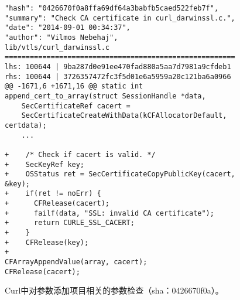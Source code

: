 \begin{figure}[t]
	\centering
\begin{lstlisting}
"hash": "0426670f0a8ffa69df64a3babfb5caed522feb7f",
"summary": "Check CA certificate in curl_darwinssl.c.",
"date": "2014-09-01 00:34:37",
"author": "Vilmos Nebehaj",
lib/vtls/curl_darwinssl.c
=======================================================
lhs: 100644 | 9ba287d0e91ee470fad880a5aa7d7981a9cfdeb1
rhs: 100644 | 3726357472fc3f5d01e6a5959a20c121ba6a0966
@@ -1671,6 +1671,16 @@ static int append_cert_to_array(struct SessionHandle *data,
	SecCertificateRef cacert =
	SecCertificateCreateWithData(kCFAllocatorDefault, certdata);
	...
	
+    /* Check if cacert is valid. */
+    SecKeyRef key;
+    OSStatus ret = SecCertificateCopyPublicKey(cacert, &key);
+    if(ret != noErr) {
+      CFRelease(cacert);
+      failf(data, "SSL: invalid CA certificate");
+      return CURLE_SSL_CACERT;
+    }
+    CFRelease(key);
+
CFArrayAppendValue(array, cacert);
CFRelease(cacert);

\end{lstlisting}
	\caption{
	Curl中对参数添加项目相关的参数检查（sha：0426670f0a）。
	}
	\label{fig:2-3-fix}
\end{figure}